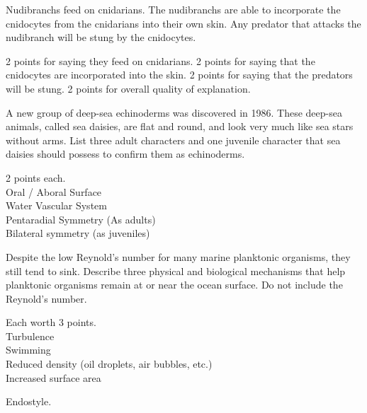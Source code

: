 \documentclass[11pt]{exam}
\begin{document}
\begin{questions}
\begin{solution}
Nudibranchs feed on cnidarians.  The nudibranchs are able to incorporate the cnidocytes from the cnidarians into their own skin.  Any predator that attacks the nudibranch will be stung by the cnidocytes.

2 points for saying they feed on cnidarians. 
2 points for saying that the cnidocytes are incorporated into the skin.
2 points for saying that the predators will be stung.
2 points for overall quality of explanation.
\end{solution}

\question[10]
A new group of deep-sea echinoderms was discovered in 1986.  These deep-sea animals, called sea daisies, are flat and round, and look very much like sea stars without arms.  List three adult characters and one juvenile character that sea daisies should possess to confirm them as echinoderms.

\begin{solution}
2 points each.\\
Oral / Aboral Surface\\
Water Vascular System\\
Pentaradial Symmetry (As adults)\\
Bilateral symmetry (as juveniles)
\end{solution}

\newpage

\question[10]
Despite the low Reynold's number for many marine planktonic organisms, they still tend to sink. Describe three physical and biological mechanisms that help planktonic organisms remain at or near the ocean surface. Do not include the Reynold's number.

	\begin{solution}
	Each worth 3 points.\\
	Turbulence\\
	Swimming\\
	Reduced density (oil droplets, air bubbles, etc.)\\
	Increased surface area
	\end{solution}

\begin{solution}Endostyle.\end{solution}


\end{questions}
\end{document}
